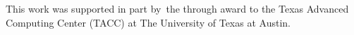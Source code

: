 \begin{acks}
This work was supported in part by the  through award  to the Texas Advanced Computing Center (TACC) at The University of Texas at Austin.
\end{acks}



